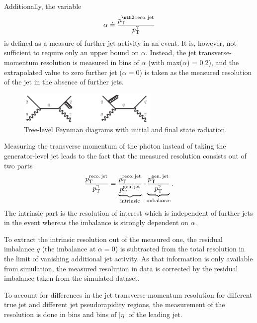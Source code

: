 Additionally, the variable 
\begin{equation*}
\label{res:eq:alphaDef}
\alpha \doteq \frac{\ptsecondrecojet}{\ptgamma}
\end{equation*} 
is defined as a measure of further jet activity in an event. 
It is, however, not sufficient to require only an upper bound on $\alpha$. 
Instead, the jet transverse-momentum resolution is measured in bins of $\alpha$ (with max($\alpha$) = 0.2), 
and the extrapolated value to zero further jet \pt ($\alpha=0$) is taken as the measured resolution of the jet \pt in the absence of further jets.
\begin{figure}[t]
  \centering
      \includegraphics[width=0.60\textwidth]{figures/resolution/generalApproach/FeynmanDiagramsWithRadiation.pdf}
  \caption{Tree-level Feynman diagrams with initial and final state radiation.}  
  \label{res:fig:FeynmanDiagramsWithRadiation}
\end{figure}

Measuring the transverse momentum of the photon instead of taking the generator-level jet \pt leads to the fact that the measured resolution consists out of two parts
\begin{equation*}\label{res:eq:splitting}
\frac{{p}_\mathrm{T}^{\text{reco.\,jet}}}{{p}_\mathrm{T}^{\gamma}} = \underbrace{\frac{{p}_\mathrm{T}^{\text{reco.\,jet}}}{{p}_\mathrm{T}^{\text{gen.\,jet}}}}_{\text{intrinsic}} \cdot \underbrace{\frac{{p}_\mathrm{T}^{\text{gen.\,jet}}}{{p}_\mathrm{T}^{\gamma}}}_{\text{imbalance}}.
\end{equation*}
The intrinsic part is the resolution of interest which is independent of further jets in the event whereas the imbalance is strongly dependent on $\alpha$.

To extract the intrinsic resolution out of the measured one, the residual imbalance $q$ (the imbalance at $\alpha = 0$) is subtracted from the total resolution in the 
limit of vanishing additional jet activity. 
As that information is only available from simulation, the measured resolution in data is corrected by the residual imbalance taken from the simulated dataset.

To account for differences in the jet transverse-momentum resolution for different true jet \pt and different jet pseudorapidity regions, the measurement of the resolution is done in \ptgamma bins and bins of $|\eta|$ of the leading jet.

